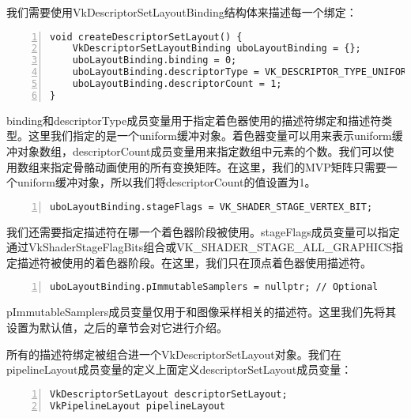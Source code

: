 \documentclass{ctexart}
\begin{document}
我们需要使用VkDescriptorSetLayoutBinding结构体来描述每一个绑定：

\begin{lstlisting}[language={[ANSI]C},keywordstyle=\color{blue!70},commentstyle=\color{red!50!green!50!blue!50},frame=shadowbox, rulesepcolor=\color{red!20!green!20!blue!20},basicstyle=\small,numbers=left, numberstyle=\tiny,breaklines=true]
void createDescriptorSetLayout() {
	VkDescriptorSetLayoutBinding uboLayoutBinding = {};
	uboLayoutBinding.binding = 0;
	uboLayoutBinding.descriptorType = VK_DESCRIPTOR_TYPE_UNIFORM_BUFFER;
	uboLayoutBinding.descriptorCount = 1;
}
\end{lstlisting}

binding和descriptorType成员变量用于指定着色器使用的描述符绑定和描述符类型。这里我们指定的是一个uniform缓冲对象。着色器变量可以用来表示uniform缓冲对象数组，descriptorCount成员变量用来指定数组中元素的个数。我们可以使用数组来指定骨骼动画使用的所有变换矩阵。在这里，我们的MVP矩阵只需要一个uniform缓冲对象，所以我们将descriptorCount的值设置为1。

\begin{lstlisting}[language={[ANSI]C},keywordstyle=\color{blue!70},commentstyle=\color{red!50!green!50!blue!50},frame=shadowbox, rulesepcolor=\color{red!20!green!20!blue!20},basicstyle=\small,numbers=left, numberstyle=\tiny,breaklines=true]
uboLayoutBinding.stageFlags = VK_SHADER_STAGE_VERTEX_BIT;
\end{lstlisting}

我们还需要指定描述符在哪一个着色器阶段被使用。stageFlags成员变量可以指定通过VkShaderStageFlagBits组合或VK\_SHADER\_STAGE\_ALL\_GRAPHICS指定描述符被使用的着色器阶段。在这里，我们只在顶点着色器使用描述符。

\begin{lstlisting}[language={[ANSI]C},keywordstyle=\color{blue!70},commentstyle=\color{red!50!green!50!blue!50},frame=shadowbox, rulesepcolor=\color{red!20!green!20!blue!20},basicstyle=\small,numbers=left, numberstyle=\tiny,breaklines=true]
uboLayoutBinding.pImmutableSamplers = nullptr; // Optional
\end{lstlisting}

pImmutableSamplers成员变量仅用于和图像采样相关的描述符。这里我们先将其设置为默认值，之后的章节会对它进行介绍。

所有的描述符绑定被组合进一个VkDescriptorSetLayout对象。我们在pipelineLayout成员变量的定义上面定义descriptorSetLayout成员变量：

\begin{lstlisting}[language={[ANSI]C},keywordstyle=\color{blue!70},commentstyle=\color{red!50!green!50!blue!50},frame=shadowbox, rulesepcolor=\color{red!20!green!20!blue!20},basicstyle=\small,numbers=left, numberstyle=\tiny,breaklines=true]
VkDescriptorSetLayout descriptorSetLayout;
VkPipelineLayout pipelineLayout
\end{lstlisting}
\end{document}
